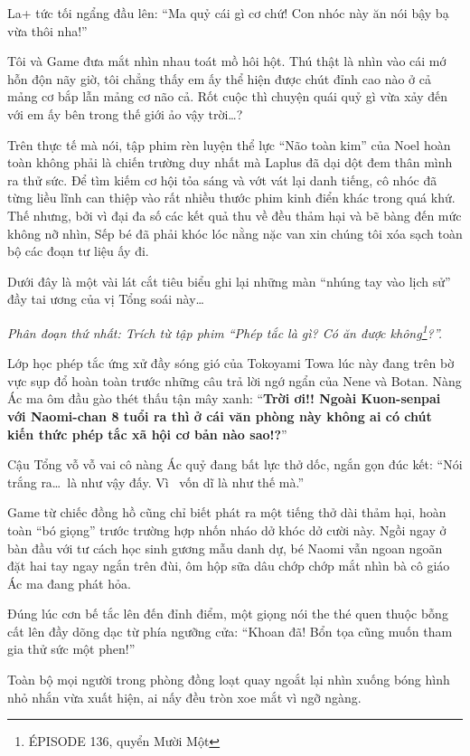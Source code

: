 \documentclass[../main.tex]{subfiles}
\begin{document}
La+ tức tối ngẩng đầu lên: ``Ma quỷ cái gì cơ chứ! Con nhóc này ăn nói bậy bạ vừa thôi nha!''

Tôi và Game đưa mắt nhìn nhau toát mồ hôi hột. Thú thật là nhìn vào cái mớ hỗn độn nãy giờ, tôi chẳng thấy em ấy thể hiện được chút đỉnh cao nào ở cả mảng cơ bắp lẫn mảng cơ não cả. Rốt cuộc thì chuyện quái quỷ gì vừa xảy đến với em ấy bên trong thế giới ảo vậy trời\dots?

\il

Trên thực tế mà nói, tập phim rèn luyện thể lực ``Não toàn kim'' của Noel hoàn toàn không phải là chiến trường duy nhất mà Laplus đã dại dột đem thân mình ra thử sức. Để tìm kiếm cơ hội tỏa sáng và vớt vát lại danh tiếng, cô nhóc đã từng liều lĩnh can thiệp vào rất nhiều thước phim kinh điển khác trong quá khứ. Thế nhưng, bởi vì đại đa số các kết quả thu về đều thảm hại và bẽ bàng đến mức không nỡ nhìn, Sếp bé đã phải khóc lóc nằng nặc van xin chúng tôi xóa sạch toàn bộ các đoạn tư liệu ấy đi.

Dưới đây là một vài lát cắt tiêu biểu ghi lại những màn ``nhúng tay vào lịch sử'' đầy tai ương của vị Tổng soái này\dots

\textit{Phân đoạn thứ nhất: Trích từ tập phim ``Phép tắc là gì? Có ăn được không\footnote{{\flaregothic ÉPISODE 136}, quyển Mười Một}?''.}

Lớp học phép tắc ứng xử đầy sóng gió của Tokoyami Towa lúc này đang trên bờ vực sụp đổ hoàn toàn trước những câu trả lời ngớ ngẩn của Nene và Botan. Nàng Ác ma ôm đầu gào thét thấu tận mây xanh: ``\textbf{Trời ơi!! Ngoài Kuon-senpai với Naomi-chan 8 tuổi ra thì ở cái văn phòng này không ai có chút kiến thức phép tắc xã hội cơ bản nào sao!?}''

Cậu Tổng vỗ vỗ vai cô nàng Ác quỷ đang bất lực thở dốc, ngắn gọn đúc kết: ``Nói trắng ra\dots\ là như vậy đấy. Vì \hll\ vốn dĩ là như thế mà.''

Game từ chiếc đồng hồ cũng chỉ biết phát ra một tiếng thở dài thảm hại, hoàn toàn ``bó giọng'' trước trường hợp nhốn nháo dở khóc dở cười này. Ngồi ngay ở bàn đầu với tư cách học sinh gương mẫu danh dự, bé Naomi vẫn ngoan ngoãn đặt hai tay ngay ngắn trên đùi, ôm hộp sữa dâu chớp chớp mắt nhìn bà cô giáo Ác ma đang phát hỏa.

Đúng lúc cơn bế tắc lên đến đỉnh điểm, một giọng nói the thé quen thuộc bỗng cất lên đầy dõng dạc từ phía ngưỡng cửa: ``Khoan đã! Bổn tọa cũng muốn tham gia thử sức một phen!''

Toàn bộ mọi người trong phòng đồng loạt quay ngoắt lại nhìn xuống bóng hình nhỏ nhắn vừa xuất hiện, ai nấy đều tròn xoe mắt vì ngỡ ngàng.
\end{document}
